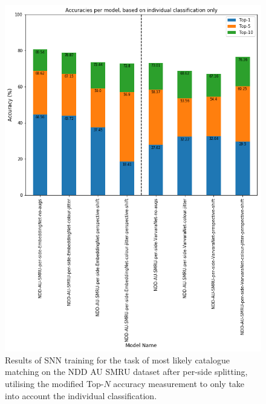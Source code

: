 \begin{figure}
	\begin{center}
		\includegraphics[scale=0.5]{Chapter5/figs/NDDAUSMRU-per-side-individual-classification-only-SNN-model-accuracies.png}
	\end{center}
	\caption{Results of SNN training for the task of most likely catalogue matching on the NDD AU SMRU dataset after per-side splitting, utilising the modified Top-$N$ accuracy measurement to only take into account the individual classification.}
	\label{fig:NDDAUSMRU-per-side-individual-classification-only-SNN-model-accuracies}
\end{figure}

